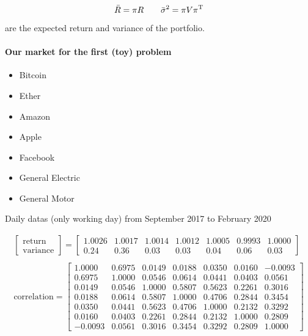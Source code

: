 \[
    \bar{R} = \pi R \qquad \bar{\sigma}^2 = \pi V \pi ^{\mathrm{T}}
\]

are the expected return and variance of the portfolio.

\paragraph{Our market for the first (toy) problem}

\begin{itemize}
    \item Bitcoin
    \item Ether
    \item Amazon
    \item Apple
    \item Facebook
    \item General Electric
    \item General Motor
\end{itemize}

Daily datas (only working day) from September 2017 to February 2020

\begin{gather*}
\begin{bmatrix}
\text{return}\\
\text{variance}
\end{bmatrix} =\begin{bmatrix}
1.0026 & 1.0017 & 1.0014 & 1.0012 & 1.0005 & 0.9993 & 1.0000\\
0.24 & 0.36 & 0.03 & 0.03 & 0.04 & 0.06 & 0.03
\end{bmatrix}\\
\\
\text{correlation} =\begin{bmatrix}
1.0000 & 0.6975 & 0.0149 & 0.0188 & 0.0350 & 0.0160 & -0.0093\\
0.6975 & 1.0000 & 0.0546 & 0.0614 & 0.0441 & 0.0403 & 0.0561\\
0.0149 & 0.0546 & 1.0000 & 0.5807 & 0.5623 & 0.2261 & 0.3016\\
0.0188 & 0.0614 & 0.5807 & 1.0000 & 0.4706 & 0.2844 & 0.3454\\
0.0350 & 0.0441 & 0.5623 & 0.4706 & 1.0000 & 0.2132 & 0.3292\\
0.0160 & 0.0403 & 0.2261 & 0.2844 & 0.2132 & 1.0000 & 0.2809\\
-0.0093 & 0.0561 & 0.3016 & 0.3454 & 0.3292 & 0.2809 & 1.0000
\end{bmatrix}
\end{gather*}

